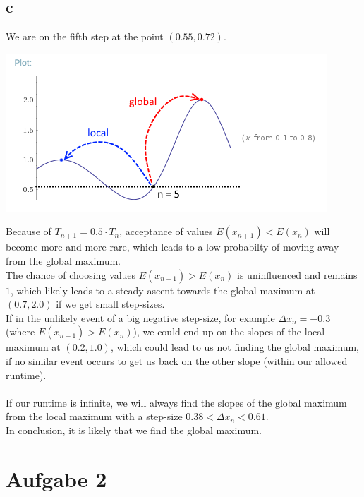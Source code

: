 \documentclass[a4paper]{article}
\begin{document}
\subsection*{c} %
We are on the fifth step at the point $(0.55, 0.72)$.
\begin{center}
	\includegraphics{a1c.png}
\end{center}
Because of $T_{n+1} = 0.5 \cdot T_n$, acceptance of values $E(x_{n+1}) < E(x_n)$ will become more and more rare, which leads to a low probabilty of moving away from the global maximum. \\
The chance of choosing values $E(x_{n+1}) > E(x_n)$ is uninfluenced and remains $1$, which likely leads to a steady ascent towards the global maximum at $(0.7, 2.0)$ if we get small step-sizes. \\
If in the unlikely event of a big negative step-size, for example $\Delta x_n = -0.3$ (where $E(x_{n+1}) > E(x_n)$), we could end up on the slopes of the local maximum at $(0.2, 1.0)$, which could lead to us not finding the global maximum, if no similar event occurs to get us back on the other slope (within our allowed runtime). \\\\
If our runtime is infinite, we will always find the slopes of the global maximum from the local maximum with a step-size $0.38 < \Delta x_n < 0.61$.\\
In conclusion, it is likely that we find the global maximum.


\section*{Aufgabe 2} %
\end{document}

